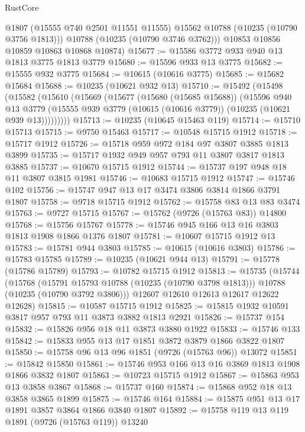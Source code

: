 \begin{lexlean}{RustCore}
\begin{coremodule}
          @1807
          (@15555 @740 @2501 @11551 @11555)
          @15562
          @10788
          (@10235 (@10790 @3756 @1813)))
        @10788
        (@10235 (@10790 @3746 @3762)))
      @10853
      @10856
      @10859
      @10863
      @10868
      @10874)
@15677 := @15586 @3772 @933 @940 @13 @1813 @3775 @1813 @3779
@15680 := @15596 @933 @13 @3775
@15682 := @15555 @932 @3775
@15684 := @10615 (@10616 @3775)
@15685 := @15682 @15684
@15688 := @10235 (@10621 @932 @13)
@15710 := @15492
    (@15498
      (@15582
        (@15610
          (@15669
            (@15677
              (@15680 (@15685 @15688))
              (@15596
                @940
                @13
                @3779
                (@15555 @939 @3779 (@10615 (@10616 @3779)) (@10235 (@10621 @939 @13)))))))))
@15713 := @10235 (@10645 @15463 @119)
@15714 := @15710 @15713
@15715 := @9750 @15463
@15717 := @10548 @15715 @1912
@15718 := @15717 @1912
@15726 := @15718 @959 @972 @184 @97 @3807 @3885 @1813 @3899
@15735 := @15717 @1932 @949 @957 @793 @11 @3807 @3817 @1813 @3885
@15737 := @10670 @15715 @1912
@15744 := @15737 @197 @948 @18 @11 @3807 @3815 @1981
@15746 := @10683 @15715 @1912
@15747 := @15746 @102
@15756 := @15747 @947 @13 @17 @3474 @3806 @3814 @1866 @3791 @1807
@15758 := @9718 @15715 @1912
@15762 := @15758 @83 @13 @83 @3474
@15763 := @9727 @15715
@15767 := @15762 (@9726 (@15763 @83)) @14800
@15768 := @15756 @15767
@15778 := @15746 @945 @166 @13 @16 @3803 @1813 @1908 @1866 @1376 @1807
@15781 := @10607 @15715 @1912 @13
@15783 := @15781 @944 @3803
@15785 := @10615 (@10616 @3803)
@15786 := @15783 @15785
@15789 := @10235 (@10621 @944 @13)
@15791 := @15778 (@15786 @15789)
@15793 := @10782 @15715 @1912
@15813 := @15735
    (@15744
      (@15768
        (@15791 @15793 @10788 (@10235 (@10790 @3798 @1813)))
        @10788
        (@10235 (@10790 @3792 @3806)))
      @12607
      @12610
      @12613
      @12617
      @12622
      @12628)
@15815 := @10587 @15715 @1912
@15825 := @15815 @1932 @10591 @3817 @957 @793 @11 @3873 @3882 @1813 @2921
@15826 := @15737 @154
@15832 := @15826 @956 @18 @11 @3873 @3880 @1922
@15833 := @15746 @133
@15842 := @15833 @955 @13 @17 @1851 @3872 @3879 @1866 @3822 @1807
@15850 := @15758 @96 @13 @96 @1851 (@9726 (@15763 @96)) @13072
@15851 := @15842 @15850
@15861 := @15746 @953 @166 @13 @16 @3869 @1813 @1908 @1866 @3832 @1807
@15863 := @10723 @15715 @1912
@15867 := @15863 @953 @13 @3858 @3867
@15868 := @15737 @160
@15874 := @15868 @952 @18 @13 @3858 @3865 @1899
@15875 := @15746 @164
@15884 := @15875 @951 @13 @17 @1891 @3857 @3864 @1866 @3840 @1807
@15892 := @15758 @119 @13 @119 @1891 (@9726 (@15763 @119)) @13240

\end{coremodule}
\end{lexlean}
